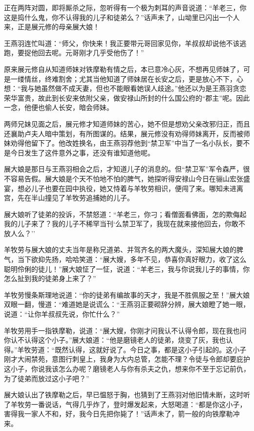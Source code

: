 \documentclass[12pt,oneside]{book}
\begin{document}
正在两阵对圆，即将厮杀之际，忽听得有一个极为刺耳的声音说道：``羊老三，你这是捣什么鬼，你不认得我的儿子和徒弟么？''话声未了，山坳里已闪出一个人来，正是展元修的母亲展大娘！

王燕羽连忙叫道：``师父，你快来！我正要带元哥回家见你，羊叔叔却说他不该逃跑，要捉他回去呢。元哥刚才几乎受他伤了！''

原来展元修自从知道师妹对铁摩勒有情之后，本已意冷心灰，不想再见师妹了，可是一缕情丝，终难割舍；尤其当他知道了师妹居在长安之后，更是放心不下，心想：``我与她虽然做不成天妻，但也不能眼看她误人歧途。''他还以为是王燕羽贪恋荣华富贵，故此到长安来依附父亲，做安禄山所封的什么国公府的``郡主''呢。因此一念，他便也偷人长安，暗会师妹。

两师兄妹见面之后，展元修才知道师妹的苦心，她不但是想劝父亲改邪归正，而且还襄助卢夫人暗中策划，有所图谋的。结果，展元修没有劝得师妹离开，反而被师妹劝得他留下了。他改姓换名，由王燕羽荐他到``禁卫军''中当了一名小队长，要不是今日发生了这件意外之事，还没有谁知道他呢。

展大娘是那日与王燕羽相会之后，才知道儿子的消息的。但``禁卫军''军令森严，很不容易告假。展大娘是个天不怕地不怕的脾气，她探听得安禄山今日在骊山宏张盛宴，想必儿子也要在园中执役，她又恃着与羊牧劳相识，便闯了来。哪知未进离宫，先在半山撞见了羊牧劳追捕她的儿子。

展大娘听了徒弟的投诉，不禁怒道：``羊老三，你刁；看僧面看佛面，怎的欺侮起我的儿子来了？我的儿子不稀罕当刊`么禁卫军了，我现在就来接他回去，你敢不放人么？''

羊牧劳与展大娘的丈夫当年是称兄道弟、并驾齐名的两大魔头，深知展大娘的脾气，当下欲抑先扬，哈哈笑道：``展大嫂，多年不见，恭喜你真好眼力，收了这么聪明伶俐的徒儿！''展大娘怔了一怔，说道：``羊老三，我与你说我儿子的事情，你怎么扯到我的徒弟身上来了？''

羊牧劳慢条斯理地说道：``你的徒弟有编故事的天才，我是不胜佩服之至！''展大娘双眼一翻，慢道：``难道她是说谎么：``王燕羽正要砌辞分辨，展大娘瞪了她一眼，说道：``让你羊叔叔先说，你忙什么？''

羊牧劳用手一指铁摩勒，说道：``展大嫂，你刚才问我认不认得令郎，现在我也问你认不认得这个小子。''展大娘道：``他是磨镜老人的徒弟，烧变了灰，我也认得。''羊牧劳道：``既然认得，这就好说了。今日之事，都是这小子引起的。这小子刚才大闹禁苑，意图行刺皇上，我身为大内总管，怎能不理？令徒与令郎却要庇护这小子，你说我该怎么办呢？磨镜老人与你有杀夫之仇，想来你不至于忘记前仇，为了徒弟而放过这小子吧？''

展大娘认出了铁摩勒之后，早已愠怒于胸，也猜到了王燕羽对他旧情未断，这时听了羊牧劳一番说话，气得几乎炸了，登时爆发起来，大怒喝道：``都是你这小子，害得我一家人不和，好，我今日先把你毙了！''话声未了，箭一般的向铁摩勒冲来。
\end{document}
